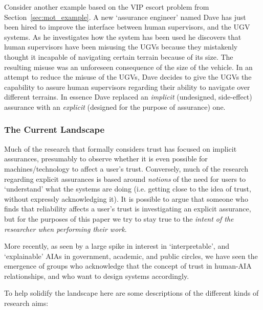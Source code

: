 Consider another example based on the VIP escort problem from Section~\ref{sec:mot_example}. A new `assurance engineer' named Dave has just been hired to improve the interface between human supervisors, and the UGV systems. As he investigates how the system has been used he discovers that human supervisors have been misusing the UGVs because they mistakenly thought it incapable of navigating certain terrain because of its size. The resulting misuse was an unforeseen consequence of the size of the vehicle. In an attempt to reduce the misuse of the UGVs, Dave decides to give the UGVs the capability to assure human supervisors regarding their ability to navigate over different terrains. In essence Dave replaced an \emph{implicit} (undesigned, side-effect) assurance with an \emph{explicit} (designed for the purpose of assurance) one. 

\subsubsection{The Current Landscape}
Much of the research that formally considers trust has focused on implicit assurances, presumably to observe whether it is even possible for machines/technology to affect a user's trust. Conversely, much of the research regarding explicit assurances is based around \emph{notions} of the need for users to `understand' what the systems are doing (i.e. getting close to the idea of trust, without expressly acknowledging it). It is possible to argue that someone who finds that reliability affects a user's trust is investigating an explicit assurance, but for the purposes of this paper we try to stay true to the \emph{intent of the researcher when performing their work}.

More recently, as seen by a large spike in interest in `interpretable', and `explainable' AIAs in government, academic, and public circles, we have seen the emergence of groups who acknowledge that the concept of trust in human-AIA relationships, and who want to design systems accordingly.

To help solidify the landscape here are some descriptions of the different kinds of research aims:

